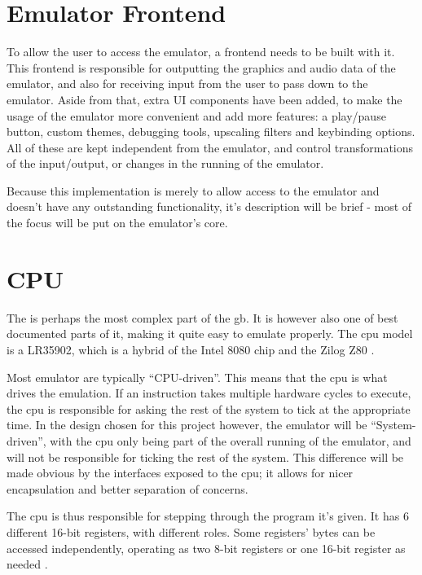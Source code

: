 \documentclass[11pt]{report}
\begin{document}
\section{Emulator Frontend}

To allow the user to access the emulator, a frontend needs to be built with it. This frontend is responsible for outputting the graphics and audio data of the emulator, and also for receiving input from the user to pass down to the emulator. Aside from that, extra UI components have been added, to make the usage of the emulator more convenient and add more features: a play/pause button, custom themes, debugging tools, upscaling filters and keybinding options. All of these are kept independent from the emulator, and control transformations of the input/output, or changes in the running of the emulator.

Because this implementation is merely to allow access to the emulator and doesn't have any outstanding functionality, it's description will be brief - most of the focus will be put on the emulator's core.

\section{CPU}

The  is perhaps the most complex part of the \gls{gb}. It is however also one of best documented parts of it, making it quite easy to emulate properly. The \gls{cpu} model is a LR35902, which is a hybrid of the Intel 8080 chip and the Zilog Z80 \cite{gbcpumanual}.

Most emulator are typically ``CPU-driven''. This means that the \gls{cpu} is what drives the emulation. If an instruction takes multiple hardware cycles to execute, the \gls{cpu} is responsible for asking the rest of the system to tick at the appropriate time. In the design chosen for this project however, the emulator will be ``System-driven'', with the \gls{cpu} only being part of the overall running of the emulator, and will not be responsible for ticking the rest of the system. This difference will be made obvious by the interfaces exposed to the \gls{cpu}; it allows for nicer encapsulation and better separation of concerns.

The \gls{cpu} is thus responsible for stepping through the program it's given. It has 6 different 16-bit registers, with different roles. Some registers' bytes can be accessed independently, operating as two 8-bit registers or one 16-bit register as needed \cite[CPU Registers and Flags]{pandoc}.
\end{document}
